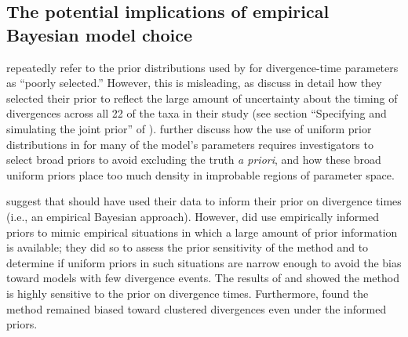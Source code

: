 \documentclass[letterpaper,12pt]{article}
\begin{document}
\begin{linenumbers}



\section*{The potential implications of empirical Bayesian model choice}
\citet{Hickerson2013} repeatedly refer to the prior distributions used by
\citet{Oaks2012} for divergence-time parameters as ``poorly selected.''
However, this is misleading, as \citet{Oaks2012} discuss in detail how they
selected their prior to reflect the large amount of uncertainty about the
timing of divergences across all 22 of the taxa in their study (see section
``Specifying and simulating the joint prior'' of \citet{Oaks2012}).
\citet{Oaks2012} further discuss how the use of uniform prior distributions in
\msb for many of the model's parameters requires investigators to select broad
priors to avoid excluding the truth \textit{a priori}, and how these broad
uniform priors place too much density in improbable regions of parameter space.

\citet{Hickerson2013} suggest that \citet{Oaks2012} should have used their
data to inform their prior on divergence times (i.e., an empirical Bayesian
approach).
However, \citet{Oaks2012} did use empirically informed priors to mimic
empirical situations in which a large amount of prior information is available;
they did so to assess the prior sensitivity of the method and to determine if
uniform priors in such situations are narrow enough to avoid the bias toward
models with few divergence events.
The results of \citet{Oaks2012} and \citet{Hickerson2013} showed the method is
highly sensitive to the prior on divergence times.
Furthermore, \citet{Oaks2012} found the method remained biased toward clustered
divergences even under the informed priors.


\end{linenumbers}
\end{document}

